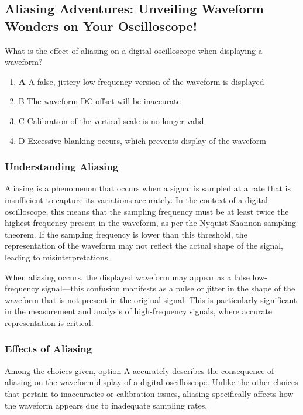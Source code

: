\subsection{Aliasing Adventures: Unveiling Waveform Wonders on Your Oscilloscope!}

\begin{tcolorbox}[colback=gray!10, colframe=black, title=E4A06] What is the effect of aliasing on a digital oscilloscope when displaying a waveform?

\begin{enumerate}[label=\Alph*.]
    \item \textbf{A} A false, jittery low-frequency version of the waveform is displayed
    \item B The waveform DC offset will be inaccurate
    \item C Calibration of the vertical scale is no longer valid
    \item D Excessive blanking occurs, which prevents display of the waveform
\end{enumerate} \end{tcolorbox}

\subsubsection{Understanding Aliasing}
Aliasing is a phenomenon that occurs when a signal is sampled at a rate that is insufficient to capture its variations accurately. In the context of a digital oscilloscope, this means that the sampling frequency must be at least twice the highest frequency present in the waveform, as per the Nyquist-Shannon sampling theorem. If the sampling frequency is lower than this threshold, the representation of the waveform may not reflect the actual shape of the signal, leading to misinterpretations.

When aliasing occurs, the displayed waveform may appear as a false low-frequency signal—this confusion manifests as a pulse or jitter in the shape of the waveform that is not present in the original signal. This is particularly significant in the measurement and analysis of high-frequency signals, where accurate representation is critical.

\subsubsection{Effects of Aliasing}
Among the choices given, option A accurately describes the consequence of aliasing on the waveform display of a digital oscilloscope. Unlike the other choices that pertain to inaccuracies or calibration issues, aliasing specifically affects how the waveform appears due to inadequate sampling rates.

